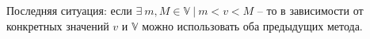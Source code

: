 \vspace{0.5in}

Последняя ситуация: если $\exists \ m, M \in \mathbb{V} \ | \ m < v < M$ -- то в зависимости от конкретных значений $v$ и $\mathbb{V}$ можно использовать оба предыдущих метода.









































































































